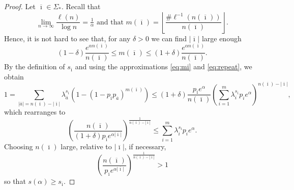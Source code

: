 \documentclass[12pt,]{article}
\theoremstyle{definition}
\theoremstyle{remark}
\newcommand{\0}{\mathbf{0}}
\newcommand{\ba}{{\overline a}}
\renewcommand{\le}{\leq}
\newcommand{\bi}{{\overline {\imath}}}
\begin{document}
\begin{proof}
  Let $\bi\in \Sigma_*$. Recall that
  \[
    \lim_{n\to \infty} \frac{\ell(n)}{\log n}=\tfrac 1\alpha\text{ and that }m(\bi)=\left\lfloor
    \frac{\#\ell^{-1}(n(\bi))}{n(\bi)}\right\rfloor.
  \]
  Hence, it is not hard to see that, for any $\delta>0$ we can find $|\bi|$ large enough
  \begin{equation}\label{eq:mi}
    (1-\delta) \frac{e^{\alpha n(\bi)}}{n(\bi)} \le m(\bi)\le (1+\delta)  \frac{e^{\alpha n(\bi)}}{n(\bi)}.
  \end{equation}
  By the definition of $s_\bi$
  and using the approximations \eqref{eq:mi} and \eqref{eq:repeat}, we obtain
  \[
    1=\sum_{|\ba|=n(\bi) - |\bi|}\lambda_{\ba}^{s_\bi}(1-(1-p_\bi p_{\ba})^{m(\bi)})\le (1+\delta)
    \frac{p_\bi e^{\alpha}}{n(\bi)}\left ( \sum_{i=1}^m \lambda_i^{s_\bi}p_ie^{\alpha}\right)^{n(\bi) - |\bi|},
  \]
  which rearranges to
  \[
    \left( \frac{n(\bi)}{(1+\delta)p_\bi e^{\alpha|\bi|}}\right)^{\frac{1}{n(\bi) - |\bi|}} \le
    \sum_{i=1}^m \lambda_i^{s_\bi}p_i e^{\alpha}.
  \]
  Choosing $n(\bi)$ large, relative to $|\bi|$, if necessary,
  \[
    \left( \frac{n(\bi)}{p_\bi e^{\alpha|\bi|}}\right)^{\frac{1}{n(\bi) - |\bi|}}> 1
  \]
  so that $s(\alpha) \geq s_{\bi}$.



\end{proof}
\end{document}
